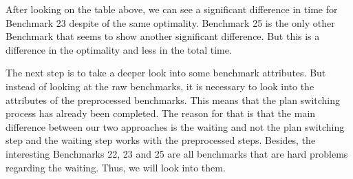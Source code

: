 \documentclass{llncs}
\begin{document}
After looking on the table above, we can see a significant difference in time for Benchmark 23 despite of the same optimality. Benchmark 25 is the only other Benchmark that seems to show another significant difference. But this is a difference in the optimality and less in the total time.

The next step is to take a deeper look into some benchmark attributes. But instead of looking at the raw benchmarks, it is necessary to look into the attributes of the preprocessed benchmarks. This means that the plan switching process has already been completed. The reason for that is that the main difference between our two approaches is the waiting and not the plan switching step and the waiting step works with the preprocessed steps. Besides, the interesting Benchmarks 22, 23 and 25 are all benchmarks that are hard problems regarding the waiting. Thus, we will look into them.
\end{document}
